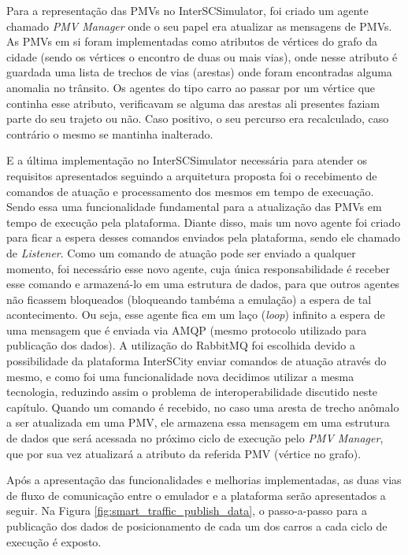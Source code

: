 Para a representação das PMVs no InterSCSimulator, foi criado um agente chamado \textit{PMV Manager} onde o seu papel era atualizar as mensagens de PMVs.
As PMVs em si foram implementadas como atributos de vértices do grafo da cidade (sendo os vértices o encontro de duas ou mais vias), onde nesse atributo é guardada uma lista
de trechos de vias (arestas) onde foram encontradas alguma anomalia no trânsito.
Os agentes do tipo carro ao passar por um vértice que continha esse atributo, verificavam se alguma das arestas ali presentes faziam parte do seu trajeto ou não.
Caso positivo, o seu percurso era recalculado, caso contrário o mesmo se mantinha inalterado.

E a última implementação no InterSCSimulator necessária para atender os requisitos apresentados seguindo a arquitetura proposta foi o recebimento de comandos de atuação e
processamento dos mesmos em tempo de execuação.
Sendo essa uma funcionalidade fundamental para a atualização das PMVs em tempo de execução pela plataforma.
Diante disso, mais um novo agente foi criado para ficar a espera desses comandos enviados pela plataforma, sendo ele chamado de \textit{Listener}.
Como um comando de atuação pode ser enviado a qualquer momento, foi necessário esse novo agente, cuja única responsabilidade é receber esse comando e armazená-lo em uma
estrutura de dados, para que outros agentes não ficassem bloqueados (bloqueando tambéma a emulação) a espera de tal acontecimento.
Ou seja, esse agente fica em um laço (\textit{loop}) infinito a espera de uma mensagem que é enviada via AMQP (mesmo protocolo utilizado para publicação dos dados).
A utilização do RabbitMQ foi escolhida devido a possibilidade da plataforma InterSCity enviar comandos de atuação através do mesmo, e como foi uma funcionalidade nova
decidimos utilizar a mesma tecnologia, reduzindo assim o problema de interoperabilidade discutido neste capítulo.
Quando um comando é recebido, no caso uma aresta de trecho anômalo a ser atualizada em uma PMV, ele armazena essa mensagem em uma estrutura de dados que será acessada no
próximo ciclo de execução pelo \textit{PMV Manager}, que por sua vez atualizará a atributo da referida PMV (vértice no grafo).

Após a apresentação das funcionalidades e melhorias implementadas, as duas vias de fluxo de comunicação entre o emulador e a plataforma serão apresentados a seguir.
Na Figura \ref{fig:smart_traffic_publish_data}, o passo-a-passo para a publicação dos dados de posicionamento de cada um dos carros a cada ciclo de execução é exposto.

